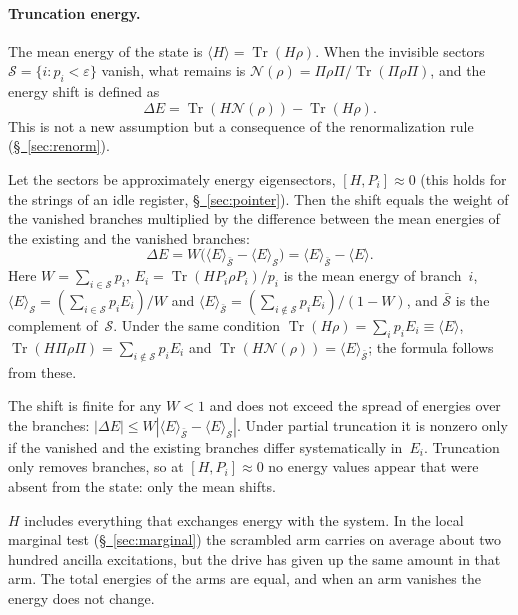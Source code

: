\documentclass[11pt,a4paper]{article}
\DeclareMathOperator{\Tr}{Tr}
\newcommand{\Sinv}{\mathcal{S}}
\begin{document}
\paragraph{Truncation energy.}
The mean energy of the state is $\langle H\rangle=\Tr(H\rho)$. When the invisible sectors $\Sinv=\{i:p_i<\varepsilon\}$ vanish, what remains is $\mathcal{N}(\rho)=\Pi\rho \Pi/\Tr(\Pi\rho \Pi)$, and the energy shift is defined as
\begin{equation}
\Delta E=\Tr(H\mathcal{N}(\rho))-\Tr(H\rho).
\end{equation}
This is not a new assumption but a consequence of the renormalization rule (\hyperref[sec:renorm]{\S~\ref*{sec:renorm}}).

Let the sectors be approximately energy eigensectors, $[H,P_i]\approx0$ (this holds for the strings of an idle register, \hyperref[sec:pointer]{\S~\ref*{sec:pointer}}). Then the shift equals the weight of the vanished branches multiplied by the difference between the mean energies of the existing and the vanished branches:
\begin{equation}
\label{eq:branch-energy}
\Delta E=W\bigl(\langle E\rangle_{\bar{\Sinv}}-\langle E\rangle_{\Sinv}\bigr)=\langle E\rangle_{\bar{\Sinv}}-\langle E\rangle.
\end{equation}
Here $W=\sum_{i\in \Sinv}p_i$, $E_i=\Tr(HP_i\rho P_i)/p_i$ is the mean energy of branch~$i$, $\langle E\rangle_{\Sinv}=(\sum_{i\in \Sinv}p_i E_i)/W$ and $\langle E\rangle_{\bar{\Sinv}}=(\sum_{i\notin \Sinv}p_i E_i)/(1-W)$, and $\bar{\Sinv}$ is the complement of~$\Sinv$. Under the same condition $\Tr(H\rho)=\sum_i p_i E_i\equiv\langle E\rangle$, $\Tr(H\Pi\rho\Pi)=\sum_{i\notin \Sinv}p_i E_i$ and $\Tr(H\mathcal{N}(\rho))=\langle E\rangle_{\bar{\Sinv}}$; the formula follows from these.

The shift is finite for any $W<1$ and does not exceed the spread of energies over the branches: $|\Delta E|\le W|\langle E\rangle_{\bar{\Sinv}}-\langle E\rangle_{\Sinv}|$. Under partial truncation it is nonzero only if the vanished and the existing branches differ systematically in~$E_i$. Truncation only removes branches, so at $[H,P_i]\approx0$ no energy values appear that were absent from the state: only the mean shifts.

$H$ includes everything that exchanges energy with the system. In the local marginal test (\hyperref[sec:marginal]{\S~\ref*{sec:marginal}}) the scrambled arm carries on average about two hundred ancilla excitations, but the drive has given up the same amount in that arm. The total energies of the arms are equal, and when an arm vanishes the energy does not change.
\end{document}
